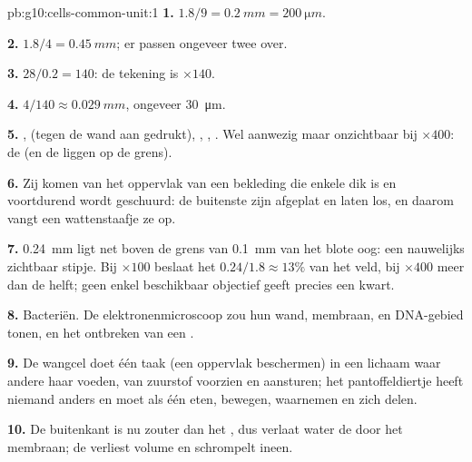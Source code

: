 \begin{solution}{pb:g10:cells-common-unit:1}
\textbf{1.} $1.8/9 = \qty{0.2}{mm} = \qty{200}{\micro m}$.

\textbf{2.} $1.8/4 = \qty{0.45}{mm}$; er passen ongeveer twee  over.

\textbf{3.} $28/0.2 = 140$: de tekening is $\times 140$.

\textbf{4.} $4/140 \approx \qty{0.029}{mm}$, ongeveer \qty{30}{\micro m}.

\textbf{5.} ,  (tegen de wand aan gedrukt),
, , . Wel aanwezig maar onzichtbaar bij
$\times 400$: de  (en de  liggen op de grens).

\textbf{6.} Zij komen van het oppervlak van een bekleding die enkele
 dik is en voortdurend wordt geschuurd: de buitenste  zijn
afgeplat en laten los, en daarom vangt een wattenstaafje ze op.

\textbf{7.} \qty{0.24}{mm} ligt net boven de grens van \qty{0.1}{mm} van
het blote oog: een nauwelijks zichtbaar stipje. Bij $\times 100$ beslaat
het $0.24/1.8 \approx 13\%$ van het veld, bij $\times 400$ meer dan de
helft; geen enkel beschikbaar objectief geeft precies een kwart.

\textbf{8.} Bacteriën. De elektronenmicroscoop zou hun wand, membraan,
 en DNA-gebied tonen, en het ontbreken van een .

\textbf{9.} De wangcel doet één taak (een oppervlak beschermen) in een
lichaam waar andere  haar voeden, van zuurstof voorzien en
aansturen; het pantoffeldiertje heeft niemand anders en moet als één
 eten, bewegen, waarnemen en zich delen.

\textbf{10.} De buitenkant is nu zouter dan het , dus verlaat
water de  door het membraan; de  verliest volume en schrompelt
ineen.


\end{solution}
